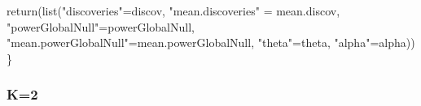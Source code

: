 \documentclass[
]{article}
\newenvironment{Shaded}{\begin{snugshade}}{\end{snugshade}}
\newcommand{\FunctionTok}[1]{\textcolor[rgb]{0.00,0.00,0.00}{#1}}
\newcommand{\NormalTok}[1]{#1}
\newcommand{\OtherTok}[1]{\textcolor[rgb]{0.56,0.35,0.01}{#1}}
\newcommand{\StringTok}[1]{\textcolor[rgb]{0.31,0.60,0.02}{#1}}
\begin{document}
\begin{Shaded}
\begin{Highlighting}[]
  \FunctionTok{return}\NormalTok{(}\FunctionTok{list}\NormalTok{(}\StringTok{"discoveries"}\OtherTok{=}\NormalTok{discov, }\StringTok{"mean.discoveries"} \OtherTok{=}\NormalTok{ mean.discov,}
              \StringTok{"powerGlobalNull"}\OtherTok{=}\NormalTok{powerGlobalNull, }\StringTok{"mean.powerGlobalNull"}\OtherTok{=}\NormalTok{mean.powerGlobalNull, }
              \StringTok{"theta"}\OtherTok{=}\NormalTok{theta, }\StringTok{"alpha"}\OtherTok{=}\NormalTok{alpha))}
\NormalTok{\}}
\end{Highlighting}
\end{Shaded}

\hypertarget{k2}{%
\subsubsection{K=2}\label{k2}}
\end{document}
